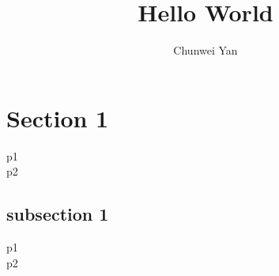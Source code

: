 \documentclass[a4paper]{article}
\author{Chunwei Yan}
\title{Hello World}
\begin{document}
\maketitle

\section{Section 1}

p1\\
p2\\
\subsection{subsection 1}

p1\\
p2\\
\end{document}
